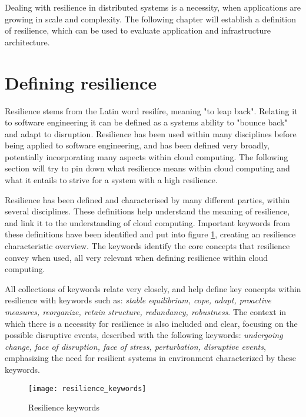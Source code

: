 Dealing with resilience in distributed systems is a necessity, when applications are growing in scale and complexity. The following chapter will establish a definition of resilience, which can be used to evaluate application and infrastructure architecture. 

\section{Defining resilience}
Resilience stems from the Latin word resilíre, meaning "to leap back". Relating it to software engineering it can be defined as a systems ability to "bounce back" and adapt to disruption. \cite{omer2013resilience} Resilience has been used within many disciplines before being applied to software engineering, and has been defined very broadly, potentially incorporating many aspects within cloud computing. The following section will try to pin down what resilience means within cloud computing and what it entails to strive for a system with a high resilience.


Resilience has been defined and characterised by many different parties, within several disciplines.\cite{folke2002resilience, dalziell2004resilience, rose2005modeling, andersson2006urban, fiksel2003designing, bruneau2003framework, reed2009methodology, pavard2006design}
These definitions help understand the meaning of resilience, and link it to the understanding of cloud computing. Important keywords from these definitions have been identified and put into figure \ref{fig:resilience_keywords}, creating an resilience characteristic overview. The keywords identify the core concepts that resilience convey when used, all very relevant when defining resilience within cloud computing.

All collections of keywords relate very closely, and help define key concepts within resilience with keywords such as: \textit{stable equilibrium, cope, adapt, proactive measures, reorganize, retain structure, redundancy, robustness}. The context in which there is a necessity for resilience is also included and clear, focusing on the possible disruptive events, described with the following keywords: \textit{undergoing change, face of disruption, face of stress, perturbation, disruptive events}, emphasizing the need for resilient systems in environment characterized by these keywords.

\begin{figure}[!htb]
  \texttt{[image: resilience\_keywords]}  
  \caption{Resilience keywords}
  \label{fig:resilience_keywords}
\end{figure}


